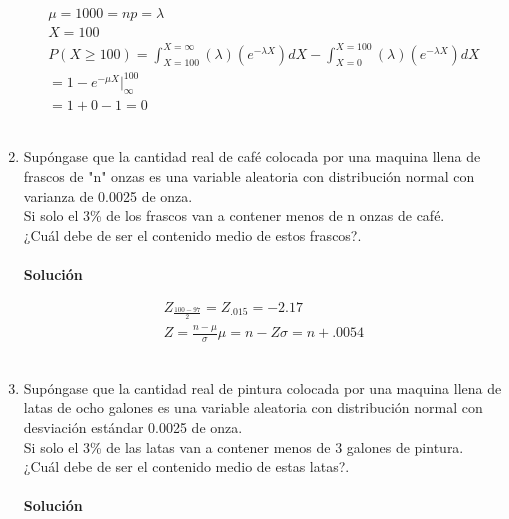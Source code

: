 \documentclass[11pt,a4paper]{article}
\begin{document}
\begin{enumerate}
	\begin{gather*}	 
	\mu = 1000 = np = \lambda\\
	X = 100\\
	P(X \geqslant 100) = \int_{X=100}^{X=\infty} (\lambda)(e^{-\lambda X})dX - \int_{X = 0}^{X = 100} (\lambda)(e^{-\lambda X})dX\\
	= 1 - e^{-\mu X}|_{\infty}^{100}\\
	=1 + 0 - 1 = 0
	\end{gather*}\\
\item Supóngase que la cantidad real de café colocada por una maquina llena de frascos de "n" onzas es una variable aleatoria con distribución normal con varianza de 0.0025 de onza.\\
Si solo el 3\% de los frascos van a contener menos de n onzas de café.\\
¿Cuál debe de ser el contenido medio de estos frascos?.\\
	\\\textbf{Solución}
	
	\begin{gather*}	 
	 Z_{\frac{100 - 97}{2}} = Z_{.015} = -2.17\\
	 Z = \frac{n -\mu}{\sigma}
	 \mu = n - Z\sigma = n + .0054
	\end{gather*}\\
\item Supóngase que la cantidad real de pintura colocada por una maquina llena de latas de ocho galones es una variable aleatoria con distribución normal con desviación estándar 0.0025 de onza.\\
Si solo el 3\% de las latas van a contener menos de 3 galones de pintura.\\
¿Cuál debe de ser el contenido medio de estas latas?.\\
	\\\textbf{Solución}
	

\end{enumerate}
\end{document}
